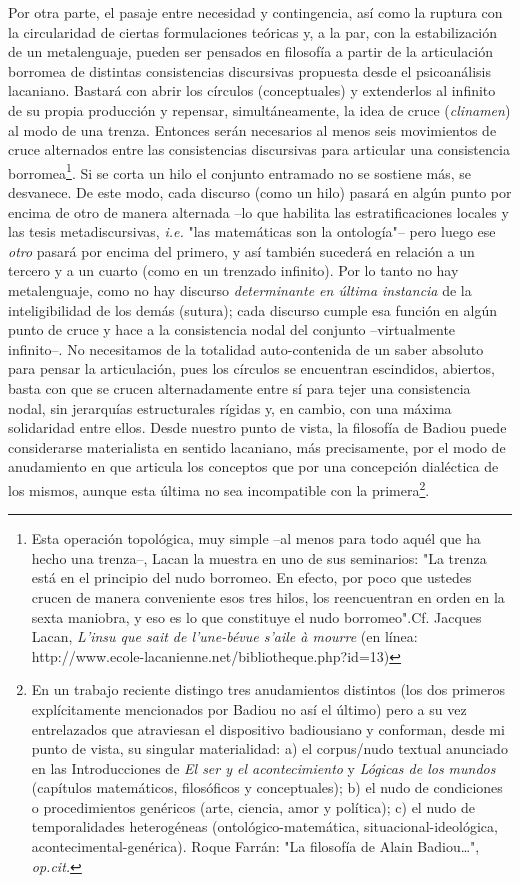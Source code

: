 Por otra parte, el pasaje entre necesidad y contingencia, así como la
ruptura con la circularidad de ciertas formulaciones teóricas y, a la
par, con la estabilización de un metalenguaje, pueden ser pensados en
filosofía a partir de la articulación borromea de distintas
consistencias discursivas propuesta desde el psicoanálisis lacaniano.
Bastará con abrir los círculos (conceptuales) y extenderlos al infinito
de su propia producción y repensar, simultáneamente, la idea de cruce
(\emph{clinamen}) al modo de una trenza. Entonces serán necesarios al
menos seis movimientos de cruce alternados entre las consistencias
discursivas para articular una consistencia borromea\footnote{Esta
  operación topológica, muy simple --al menos para todo aquél que ha
  hecho una trenza--, Lacan la muestra en uno de sus seminarios: "La
  trenza está en el principio del nudo borromeo. En efecto, por poco que
  ustedes crucen de manera conveniente esos tres hilos, los reencuentran
  en orden en la sexta maniobra, y eso es lo que constituye el nudo
  borromeo".Cf. Jacques Lacan, \emph{L'insu que sait de l'une-bévue
  s'aile à mourre} (en línea:
  http://www.ecole-lacanienne.net/bibliotheque.php?id=13)}. Si se corta
un hilo el conjunto entramado no se sostiene más, se desvanece. De este
modo, cada discurso (como un hilo) pasará en algún punto por encima de
otro de manera alternada --lo que habilita las estratificaciones locales
y las tesis metadiscursivas, \emph{i.e.} "las matemáticas son la
ontología"-- pero luego ese \emph{otro} pasará por encima del primero, y
así también sucederá en relación a un tercero y a un cuarto (como en un
trenzado infinito). Por lo tanto no hay metalenguaje, como no hay
discurso \emph{determinante en última instancia} de la inteligibilidad
de los demás (sutura); cada discurso cumple esa función en algún punto
de cruce y hace a la consistencia nodal del conjunto --virtualmente
infinito--. No necesitamos de la totalidad auto-contenida de un saber
absoluto para pensar la articulación, pues los círculos se encuentran
escindidos, abiertos, basta con que se crucen alternadamente entre sí
para tejer una consistencia nodal, sin jerarquías estructurales rígidas
y, en cambio, con una máxima solidaridad entre ellos. Desde nuestro
punto de vista, la filosofía de Badiou puede considerarse materialista
en sentido lacaniano, más precisamente, por el modo de anudamiento en
que articula los conceptos que por una concepción dialéctica de los
mismos, aunque esta última no sea incompatible con la
primera\footnote{En un trabajo reciente distingo tres anudamientos
  distintos (los dos primeros explícitamente mencionados por Badiou no
  así el último) pero a su vez entrelazados que atraviesan el
  dispositivo badiousiano y conforman, desde mi punto de vista, su
  singular materialidad: a) el corpus/nudo textual anunciado en las
  Introducciones de \emph{El ser y el acontecimiento} y \emph{Lógicas de
  los mundos} (capítulos matemáticos, filosóficos y conceptuales); b) el
  nudo de condiciones o procedimientos genéricos (arte, ciencia, amor y
  política); c) el nudo de temporalidades heterogéneas
  (ontológico-matemática, situacional-ideológica,
  acontecimental-genérica). Roque Farrán: "La filosofía de Alain
  Badiou\ldots", \emph{op.cit.}}.

